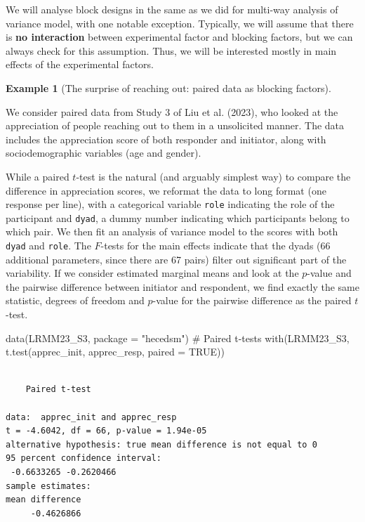 \documentclass[
  11pt,
  letterpaper,
]{scrbook}
\newenvironment{Shaded}{\begin{snugshade}}{\end{snugshade}}
\newcommand{\AttributeTok}[1]{\textcolor[rgb]{0.40,0.45,0.13}{#1}}
\newcommand{\CommentTok}[1]{\textcolor[rgb]{0.37,0.37,0.37}{#1}}
\newcommand{\ConstantTok}[1]{\textcolor[rgb]{0.56,0.35,0.01}{#1}}
\newcommand{\FunctionTok}[1]{\textcolor[rgb]{0.28,0.35,0.67}{#1}}
\newcommand{\NormalTok}[1]{\textcolor[rgb]{0.00,0.23,0.31}{#1}}
\newcommand{\StringTok}[1]{\textcolor[rgb]{0.13,0.47,0.30}{#1}}
\theoremstyle{definition}
\newtheorem{example}{Example}[chapter]
\theoremstyle{definition}
\theoremstyle{remark}
\begin{document}
We will analyse block designs in the same as we did for multi-way
analysis of variance model, with one notable exception. Typically, we
will assume that there is \textbf{no interaction} between experimental
factor and blocking factors, but we can always check for this
assumption. Thus, we will be interested mostly in main effects of the
experimental factors.

\begin{example}[The surprise of reaching out: paired data as blocking
factors]\protect\hypertarget{exm-reachingout}{}\label{exm-reachingout}

We consider paired data from Study 3 of Liu et al. (2023), who looked at
the appreciation of people reaching out to them in a unsolicited manner.
The data includes the appreciation score of both responder and
initiator, along with sociodemographic variables (age and gender).

While a paired \(t\)-test is the natural (and arguably simplest way) to
compare the difference in appreciation scores, we reformat the data to
long format (one response per line), with a categorical variable
\texttt{role} indicating the role of the participant and \texttt{dyad},
a dummy number indicating which participants belong to which pair. We
then fit an analysis of variance model to the scores with both
\texttt{dyad} and \texttt{role}. The \(F\)-tests for the main effects
indicate that the dyads (66 additional parameters, since there are 67
pairs) filter out significant part of the variability. If we consider
estimated marginal means and look at the \(p\)-value and the pairwise
difference between initiator and respondent, we find exactly the same
statistic, degrees of freedom and \(p\)-value for the pairwise
difference as the paired \(t\)-test.

\begin{Shaded}
\begin{Highlighting}[]
\FunctionTok{data}\NormalTok{(LRMM23\_S3, }\AttributeTok{package =} \StringTok{"hecedsm"}\NormalTok{)}
\CommentTok{\# Paired t{-}tests}
\FunctionTok{with}\NormalTok{(LRMM23\_S3, }\FunctionTok{t.test}\NormalTok{(apprec\_init, apprec\_resp, }\AttributeTok{paired =} \ConstantTok{TRUE}\NormalTok{))}
\end{Highlighting}
\end{Shaded}

\begin{verbatim}

    Paired t-test

data:  apprec_init and apprec_resp
t = -4.6042, df = 66, p-value = 1.94e-05
alternative hypothesis: true mean difference is not equal to 0
95 percent confidence interval:
 -0.6633265 -0.2620466
sample estimates:
mean difference 
     -0.4626866 
\end{verbatim}


\end{example}
\end{document}
